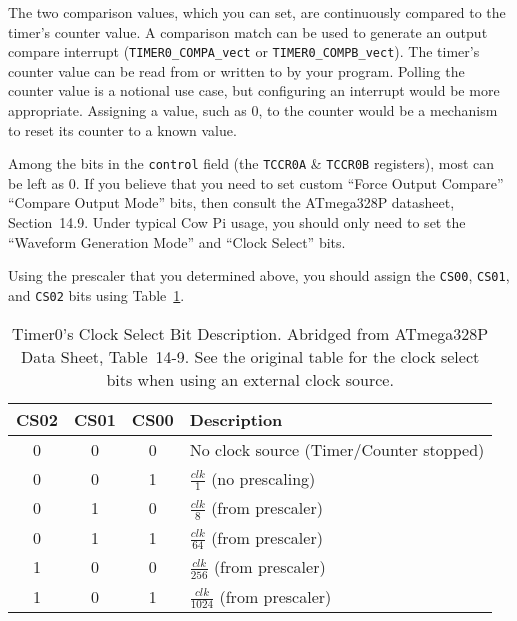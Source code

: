 The two comparison values, which you can set, are continuously compared to the timer's counter value.
A comparison match can be used to generate an output compare interrupt (\lstinline{TIMER0_COMPA_vect} or \lstinline{TIMER0_COMPB_vect}).
The timer's counter value can be read from or written to by your program.
Polling the counter value is a notional use case, but configuring an interrupt would be more appropriate.
Assigning a value, such as 0, to the counter would be a mechanism to reset its counter to a known value.

Among the bits in the \lstinline{control} field (the \texttt{TCCR0A} \& \texttt{TCCR0B} registers), most can be left as 0.
If you believe that you need to set custom ``Force Output Compare'' ``Compare Output Mode'' bits, then consult the ATmega328P datasheet, Section~14.9.\cite{ATmega328P}
Under typical Cow Pi usage, you should only need to set the ``Waveform Generation Mode'' and ``Clock Select'' bits.

Using the prescaler that you determined above, you should assign the \texttt{CS00}, \texttt{CS01}, and \texttt{CS02} bits using Table~\ref{tab:timer0clockselect}.

\begin{table}[h]
    \centering \small
    \begin{tabular}{|c|c|c|l|} \hline
    \textbf{CS02}   & \textbf{CS01} & \textbf{CS00} & \textbf{Description}                      \\ \hline\hline
    0               & 0             & 0             & No clock source (Timer/Counter stopped)   \\ \hline
    0               & 0             & 1             & $\frac{clk}{1}$ (no prescaling)           \\ \hline
    0               & 1             & 0             & $\frac{clk}{8}$ (from prescaler)          \\ \hline
    0               & 1             & 1             & $\frac{clk}{64}$ (from prescaler)         \\ \hline
    1               & 0             & 0             & $\frac{clk}{256}$ (from prescaler)        \\ \hline
    1               & 0             & 1             & $\frac{clk}{1024}$ (from prescaler)       \\ \hline
    \end{tabular}
    \caption{Timer0's Clock Select Bit Description. \tiny Abridged from ATmega328P Data Sheet, Table~14\mbox{-}9.\cite{ATmega328P} See the original table for the clock select bits when using an external clock source. \label{tab:timer0clockselect}}
\end{table}

